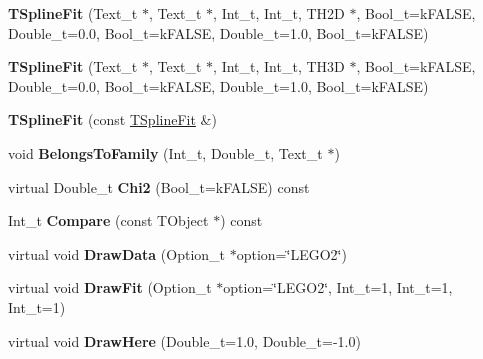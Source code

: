 \begin{DoxyCompactItemize}
\item 
\hypertarget{classTSplineFit_a588b2c3be05e32c03ce8396a35d57733}{
{\bfseries TSplineFit} (Text\_\-t $\ast$, Text\_\-t $\ast$, Int\_\-t, Int\_\-t, TH2D $\ast$, Bool\_\-t=kFALSE, Double\_\-t=0.0, Bool\_\-t=kFALSE, Double\_\-t=1.0, Bool\_\-t=kFALSE)}
\label{classTSplineFit_a588b2c3be05e32c03ce8396a35d57733}

\item 
\hypertarget{classTSplineFit_a7996e79008a2220578fcac0ef83435ea}{
{\bfseries TSplineFit} (Text\_\-t $\ast$, Text\_\-t $\ast$, Int\_\-t, Int\_\-t, TH3D $\ast$, Bool\_\-t=kFALSE, Double\_\-t=0.0, Bool\_\-t=kFALSE, Double\_\-t=1.0, Bool\_\-t=kFALSE)}
\label{classTSplineFit_a7996e79008a2220578fcac0ef83435ea}

\item 
\hypertarget{classTSplineFit_ae43b5fca75b0956a1267b375f3020d03}{
{\bfseries TSplineFit} (const \hyperlink{classTSplineFit}{TSplineFit} \&)}
\label{classTSplineFit_ae43b5fca75b0956a1267b375f3020d03}

\item 
\hypertarget{classTSplineFit_afd0d11e8340d8a1d7b70dc54ea982447}{
void {\bfseries BelongsToFamily} (Int\_\-t, Double\_\-t, Text\_\-t $\ast$)}
\label{classTSplineFit_afd0d11e8340d8a1d7b70dc54ea982447}

\item 
\hypertarget{classTSplineFit_ac4c27000e1a5ac6c733393115de73f10}{
virtual Double\_\-t {\bfseries Chi2} (Bool\_\-t=kFALSE) const }
\label{classTSplineFit_ac4c27000e1a5ac6c733393115de73f10}

\item 
\hypertarget{classTSplineFit_a149ca22416c3df776f38d6b37f191ac5}{
Int\_\-t {\bfseries Compare} (const TObject $\ast$) const }
\label{classTSplineFit_a149ca22416c3df776f38d6b37f191ac5}

\item 
\hypertarget{classTSplineFit_a2919b0a4eef386eeb6e542a7408e5c7f}{
virtual void {\bfseries DrawData} (Option\_\-t $\ast$option=\char`\"{}LEGO2\char`\"{})}
\label{classTSplineFit_a2919b0a4eef386eeb6e542a7408e5c7f}

\item 
\hypertarget{classTSplineFit_a62c373358ad56ed8836252cf2e2a7239}{
virtual void {\bfseries DrawFit} (Option\_\-t $\ast$option=\char`\"{}LEGO2\char`\"{}, Int\_\-t=1, Int\_\-t=1, Int\_\-t=1)}
\label{classTSplineFit_a62c373358ad56ed8836252cf2e2a7239}

\item 
\hypertarget{classTSplineFit_a0160d7ee2c749dba80d2f0db6ab891c8}{
virtual void {\bfseries DrawHere} (Double\_\-t=1.0, Double\_\-t=-\/1.0)}
\label{classTSplineFit_a0160d7ee2c749dba80d2f0db6ab891c8}


\end{DoxyCompactItemize}
